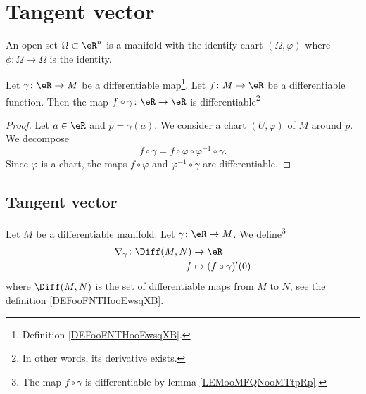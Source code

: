 \section{Tangent vector}

\begin{definition}
	An open set \( \Omega\subset \eR^n\) is a manifold with the identify chart \( (\Omega, \varphi)\) where \( \phi\colon \Omega\to \Omega\) is the identity.
\end{definition}

\begin{lemma}		\label{LEMooMFQNooMTtpRp}
	Let \( \gamma\colon \eR\to M\) be a differentiable map\footnote{Definition \ref{DEFooFNTHooEwsqXB}.}. Let \( f\colon M\to \eR\) be a differentiable function. Then the map \( f\circ \gamma\colon \eR\to \eR\) is differentiable\footnote{In other words, its derivative exists.}
\end{lemma}

\begin{proof}
	Let \( a\in \eR\) and \( p=\gamma(a)\). We consider a chart \( (U,\varphi)\) of \( M\) around \( p\). We decompose
	\begin{equation}
		f\circ \gamma= f\circ \varphi\circ \varphi^{-1}\circ\gamma.
	\end{equation}
	Since \( \varphi\) is a chart, the maps \( f\circ\varphi\) and \( \varphi^{-1}\circ\gamma\) are differentiable.
\end{proof}


\subsection{Tangent vector}


\begin{definition}      \label{DEFooJJVIooDUBwDJ}
	Let \( M\) be a differentiable manifold. Let \(\gamma \colon \eR\to M  \). We define\footnote{The map \( f\circ\gamma\) is differentiable by lemma \ref{LEMooMFQNooMTtpRp}.}
	\begin{equation}
		\begin{aligned}
			\nabla_{\gamma}\colon \Diff(M,N) & \to \eR                    \\
			f                                & \mapsto (f\circ\gamma)'(0)
		\end{aligned}
	\end{equation}
	where \( \Diff(M,N)\) is the set of differentiable maps from \( M\) to \( N\), see the definition \ref{DEFooFNTHooEwsqXB}.
\end{definition}

